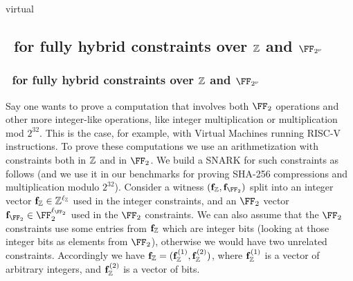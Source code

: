 \begin{lncsappendix}{virtual}

%



\iflncs\subsection{\ftwoz \ for fully hybrid constraints over $\mathbb{Z}$ and $\comfield$}\label{s:hybrid_snark}\else\subsubsection{\ftwoz \ for fully hybrid constraints over $\mathbb{Z}$ and $\comfield$}\label{s:hybrid_snark}\fi



Say one wants to prove a computation that involves both  $\FF_2$ operations and other more integer-like operations, like integer multiplication or multiplication mod $2^{32}$. This is the case, for example, with Virtual Machines running RISC-V instructions. To prove these computations we use an arithmetization with constraints both in $\mathbb{Z}$ and in $\FF_2$. We build a SNARK for such constraints as follows (and we use it in our benchmarks for proving SHA-256 compressions and multiplication modulo $2^{32}$). Consider a witness $(\bff_\ZZ, \bff_{\FF_2})$ split into an integer vector $\mathbf{f}_{\mathbb{Z}}\in \mathbb{Z}^{\ell_{\mathbb{Z}}}$ used in the integer constraints, and an $\FF_2$ vector $\bff_{\FF_2}\in \FF_2^{\codedim_{\FF_2}}$ used in the $\FF_2$ constraints. We can also assume that the $\FF_2$ constraints  use some entries from $\mathbf{f}_{\mathbb{Z}}$ which are integer bits (looking at those integer bits as elements from $\FF_2$), otherwise we would have two unrelated constraints. Accordingly we have $\mathbf{f}_{\mathbb{Z}}=(\mathbf{f}_{\mathbb{Z}}^{(1)}, \mathbf{f}_{\mathbb{Z}}^{(2)})$, where $\mathbf{f}_{\mathbb{Z}}^{(1)}$ is a vector of arbitrary integers, and $\mathbf{f}_{\mathbb{Z}}^{(2)}$ is a vector of bits.


\end{lncsappendix}
